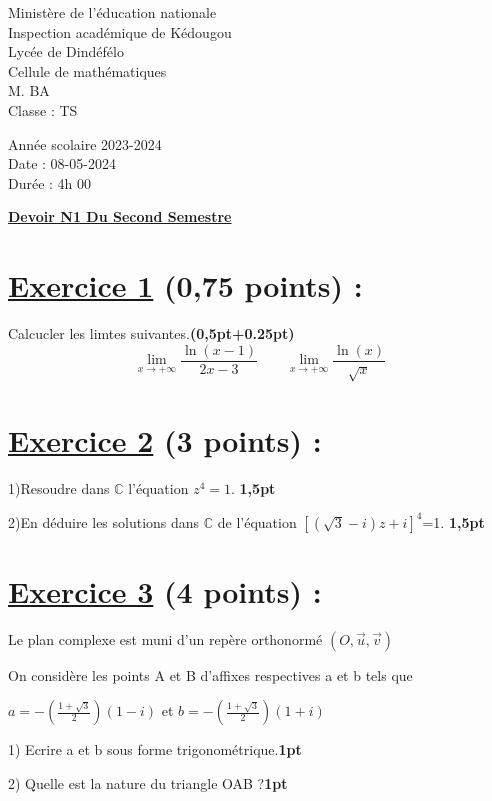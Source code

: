 \documentclass[12pt]{article}
\begin{document}
\begin{minipage}{0.5\textwidth}
	Ministère de l'éducation nationale  \\
	Inspection académique de Kédougou   \\
	Lycée de Dindéfélo            \\
	Cellule de mathématiques            \\
	M. BA                          \\
	Classe : TS  \\
\end{minipage}
\begin{minipage}{0.5\textwidth}
	Année scolaire 2023-2024 \\
	Date : 08-05-2024 \\
	Durée : 4h 00 \\
\end{minipage}

\begin{center}
	\textbf{{\underline{Devoir N1 Du Second Semestre}}}
\end{center}
\section*{\underline{Exercice 1} (0,75 points) :}
Calcucler les limtes suivantes.\textbf{(0,5pt+0.25pt)}
\[\lim_{x \to +\infty}\frac{\ln(x-1)}{2x-3}\quad\quad\lim_{x \to +\infty}\frac{\ln(x)}{\sqrt{x}}\]
\section*{\underline{Exercice 2} (3 points) :}
1)Resoudre dans $\mathbb{C}$ l'équation $z^{4}=1$. \textbf{1,5pt}

2)En déduire les solutions dans $\mathbb{C}$ de l'équation $\left[\left(\sqrt{3}-i\right)z+i  \right]^{4}$=1. \textbf{1,5pt}
\section*{\underline{Exercice 3} (4 points) :}
Le plan complexe est muni d’un repère orthonormé $(O,\vec{u},\vec{v})$

On considère les points A et B d’affixes respectives a et b tels que

$a=-(\frac{1+\sqrt{3}}{2})(1-i)$ et $b=-(\frac{1+\sqrt{3}}{2})(1+i)$ 

1) Ecrire a et b sous forme trigonométrique.\textbf{1pt}

2) Quelle est la nature du triangle OAB ?\textbf{1pt}
\end{document}
